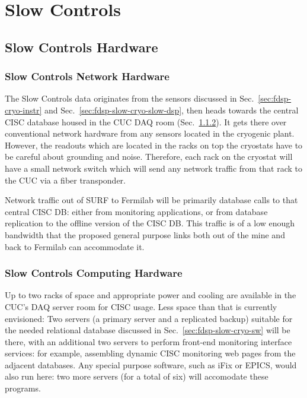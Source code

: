 \section{Slow Controls}
\label{sec:fdsp-slow-cryo-ctrl}




\subsection{Slow Controls Hardware}
\label{sec:fdsp-slow-cryo-hdwr}

\subsubsection{Slow Controls Network Hardware}
\label{sec:fdsp-slow-cryo-slow-network}
The Slow Controls data originates from the sensors discussed in
Sec.~\ref{sec:fdsp-cryo-instr} and
Sec.~\ref{sec:fdsp-slow-cryo-slow-dsp}, then heads towards the central
CISC database housed in the CUC DAQ room
(Sec.~\ref{sec:fdsp-slow-cryo-slow-compute}).  It gets there over
conventional network hardware from any sensors located in the cryogenic
plant.  However, the readouts which are located in the racks on top the
cryostats have to be careful about grounding and noise.  Therefore, each
rack on the cryostat will have a small network switch which will send
any network traffic from that rack to the CUC via a fiber transponder.

Network traffic out of SURF to Fermilab will be primarily database calls
to that central CISC DB: either from monitoring applications, or from
database replication to the offline version of the CISC DB.  This
traffic is of a low enough bandwidth that the proposed general purpose
links both out of the mine and back to Fermilab can accommodate it.

\subsubsection{Slow Controls Computing Hardware}
\label{sec:fdsp-slow-cryo-slow-compute}

Up to two racks of space and appropriate power and cooling are available
in the CUC's DAQ server room for CISC usage.  Less space than that is
currently envisioned: Two servers (a primary server and a replicated
backup) suitable for the needed relational database discussed in
Sec.~\ref{sec:fdsp-slow-cryo-sw} will be there, with an additional two
servers to perform front-end monitoring interface services: for example,
assembling dynamic CISC monitoring web pages from the adjacent
databases.  Any special purpose software, such as iFix or EPICS, would
also run here: two more servers (for a total of six) will accomodate
these programs.

